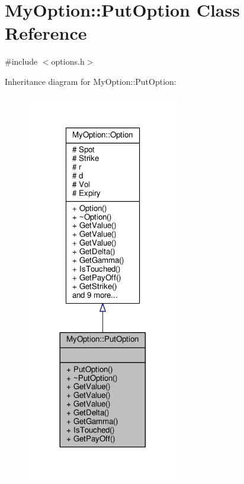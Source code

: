 \hypertarget{classMyOption_1_1PutOption}{}\section{My\+Option\+:\+:Put\+Option Class Reference}
\label{classMyOption_1_1PutOption}


{\ttfamily \#include $<$options.\+h$>$}



Inheritance diagram for My\+Option\+:\+:Put\+Option\+:
\nopagebreak
\begin{figure}[H]
\begin{center}
\leavevmode
\includegraphics[width=188pt]{classMyOption_1_1PutOption__inherit__graph}
\end{center}
\end{figure}



